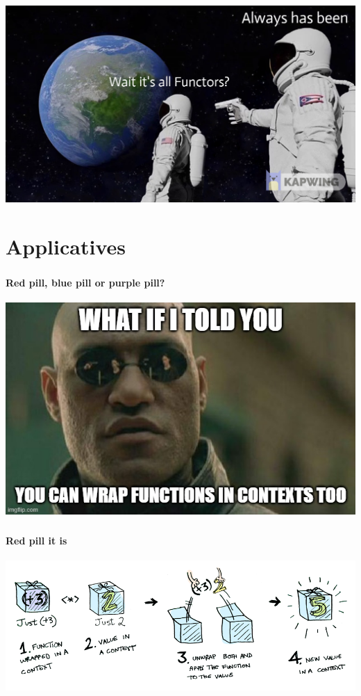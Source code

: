\documentclass{beamer}
\begin{document}
\begin{frame}
    \frametitle{\insertsection}
    \centerline{\includegraphics[scale=0.2]{images/astro_meme.png}}
\end{frame}


\section{Applicatives}

\begin{frame}
    \frametitle{\insertsection}
    \framesubtitle{Red pill, blue pill or purple pill?}
    \centerline{\includegraphics[scale=0.5]{images/what_if.jpg}}
\end{frame}

\begin{frame}
    \frametitle{\insertsection}
    \framesubtitle{Red pill it is\textellipsis}
    \centerline{\includegraphics[scale=0.35]{images/applicative_just.png}}
\end{frame}
\end{document}
